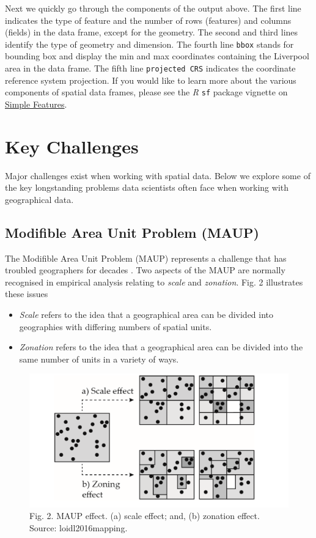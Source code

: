 \documentclass[
]{book}
\begin{document}
Next we quickly go through the components of the output above. The first line indicates the type of feature and the number of rows (features) and columns (fields) in the data frame, except for the geometry. The second and third lines identify the type of geometry and dimension. The fourth line \texttt{bbox} stands for bounding box and display the min and max coordinates containing the Liverpool area in the data frame. The fifth line \texttt{projected\ CRS} indicates the coordinate reference system projection. If you would like to learn more about the various components of spatial data frames, please see the \emph{R} \texttt{sf} package vignette on \href{https://r-spatial.github.io/sf/articles/sf1.html}{Simple Features}.

\hypertarget{key-challenges}{%
\section{Key Challenges}\label{key-challenges}}

Major challenges exist when working with spatial data. Below we explore some of the key longstanding problems data scientists often face when working with geographical data.

\hypertarget{modifible-area-unit-problem-maup}{%
\subsection{Modifible Area Unit Problem (MAUP)}\label{modifible-area-unit-problem-maup}}

The Modifible Area Unit Problem (MAUP) represents a challenge that has troubled geographers for decades \citep{openshaw1981modifiable}. Two aspects of the MAUP are normally recognised in empirical analysis relating to \emph{scale} and \emph{zonation}. Fig. 2 illustrates these issues

\begin{itemize}
\item
  \emph{Scale} refers to the idea that a geographical area can be divided into geographies with differing numbers of spatial units.
\item
  \emph{Zonation} refers to the idea that a geographical area can be divided into the same number of units in a variety of ways.
\end{itemize}

\begin{figure}
\centering
\includegraphics{figs/ch1/maup.png}
\caption{Fig. 2. MAUP effect. (a) scale effect; and, (b) zonation effect. Source: loidl2016mapping.}
\end{figure}
\end{document}

